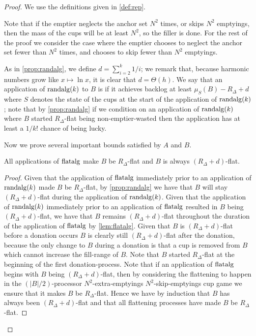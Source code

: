 \begin{proof}
  We use the definitions given in \cref{def:rep}.

  Note that if the emptier neglects the anchor set $N^2$ times,
  or skips $N^2$ emptyings, then the mass of the cups will be at
  least $N^2$, so the filler is done. For the rest of the proof
  we consider the case where the emptier chooses to neglect
  the anchor set fewer than $N^2$ times, and chooses to skip fewer
  than $N^2$ emptyings.

As in \cref{prop:randalg}, we define $d =
\sum_{i=2}^{k} 1/i$; we remark that, because harmonic numbers
grow like $x\mapsto \ln x$, it is clear that $d=\Theta(h)$. We say that an
application of $\operatorname{\text{\textup{randalg}}}(k)$ to $B$ is  if it
achieves backlog at least $\mu_S(B) - R_\Delta + d$ where $S$
denotes the state of the cups at the start of the application of
$\operatorname{\text{\textup{randalg}}}(k)$; note that by
\cref{prop:randalg} if we condition on an
application of $\operatorname{\text{\textup{randalg}}}(k)$ where $B$ started $R_\Delta$-flat
being non-emptier-wasted then the application has at least a
$1/k!$ chance of being lucky.

Now we prove several important bounds satisfied by $A$ and $B$.
\begin{clm}
  \label{clm:allflatteningsworkbyM}
  All applications of $\operatorname{\text{\textup{flatalg}}}$ make $B$ be $R_\Delta$-flat and
  $B$ is always $(R_\Delta + d)$-flat.
\end{clm}
\begin{proof}
  Given that the application of $\operatorname{\text{\textup{flatalg}}}$ immediately prior to an application
  of $\operatorname{\text{\textup{randalg}}}(k)$ made $B$ be $R_\Delta$-flat, by
  \cref{prop:randalg} we have that $B$ will
  stay $(R_\Delta + d)$-flat during the application of $\operatorname{\text{\textup{randalg}}}(k)$. 
  Given that the application of $\operatorname{\text{\textup{randalg}}}(k)$ immediately prior to an
  application of $\operatorname{\text{\textup{flatalg}}}$ resulted in $B$ being $(R_\Delta
  + d)$-flat, we have that $B$ remains $(R_\Delta + d)$-flat
  throughout the duration of the application of $\operatorname{\text{\textup{flatalg}}}$ by
  \cref{lem:flatalg}. Given that $B$ is $(R_\Delta +
  d)$-flat before a donation occurs $B$ is clearly still $(R_\Delta +
  d)$-flat after the donation, because the only change to $B$ during
  a donation is that a cup is removed from $B$ which cannot increase
  the fill-range of $B$.
  Note that $B$ started $R_\Delta$-flat at the beginning of the
  first donation-process.
  Note that if an application of $\operatorname{\text{\textup{flatalg}}}$ begins with $B$ being
  $(R_\Delta + d)$-flat, then by considering the flattening to
  happen in the $(|B|/2)$-processor $N^2$-extra-emptyings
  $N^2$-skip-emptyings cup game we ensure that it makes $B$ be
  $R_\Delta$-flat.
  Hence we have by induction that $B$ has always been $(R_\Delta
  + d)$-flat and that all flattening processes have made $B$ be
  $R_\Delta$-flat. 
\end{proof}


\end{proof}
